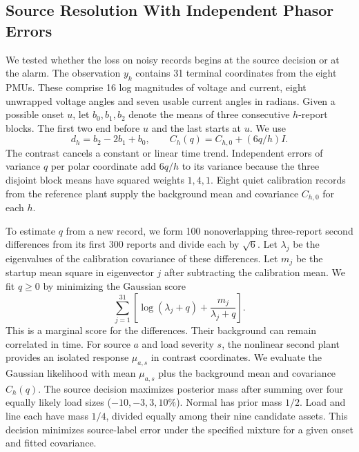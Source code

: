 \subsection{Source Resolution With Independent Phasor Errors}
\label{app:phasor-noise-contrast}

We tested whether the loss on noisy records begins at the source
decision or at the alarm. The observation $y_k$ contains 31 terminal
coordinates from the eight PMUs. These comprise 16 log magnitudes
of voltage and current, eight unwrapped voltage angles and seven
usable current angles in radians. Given a possible onset $u$, let $b_0,b_1,b_2$
denote the means of three consecutive $h$-report blocks. The first two
end before $u$ and the last starts at $u$. We use
\[
 d_h=b_2-2b_1+b_0,\qquad
 C_h(q)=C_{h,0}+(6q/h)I .
\]
The contrast cancels a constant or linear time trend. Independent
errors of variance $q$ per polar coordinate add $6q/h$ to its
variance because the three disjoint block means have squared weights
$1,4,1$. Eight quiet calibration records from the reference plant
supply the background mean and covariance $C_{h,0}$ for each $h$.

To estimate $q$ from a new record, we form 100 nonoverlapping
three-report second differences from its first 300 reports and divide
each by $\sqrt{6}$. Let $\lambda_j$ be the eigenvalues of the
calibration covariance of these differences. Let $m_j$ be the
startup mean square in eigenvector $j$ after subtracting the
calibration mean. We fit $q\geq0$ by minimizing the Gaussian score
\[
 \sum_{j=1}^{31}\left[\log(\lambda_j+q)+
                   \frac{m_j}{\lambda_j+q}\right].
\]
This is a marginal score for the differences. Their background can
remain correlated in time. For source $a$ and load severity $s$, the
nonlinear second plant provides an isolated response $\mu_{a,s}$ in
contrast coordinates. We evaluate the Gaussian likelihood with mean
$\mu_{a,s}$ plus the background mean and covariance $C_h(q)$.
The source decision maximizes posterior mass after summing over four
equally likely load sizes ($-10,-3,3,10\%$). Normal has prior mass
$1/2$. Load and line each have mass $1/4$, divided equally among
their nine candidate assets. This decision minimizes source-label
error under the specified mixture for a given onset and fitted
covariance.

\begin{table}[t]\centering\small
\caption{Source decisions one second after a supplied onset. Each
condition uses the same 432 load, 108 line and 540 quiet windows.
Quiet$^+$ counts quiet windows labeled as physical events.}
\label{tab:pmu-contrast-window}

\end{table}

